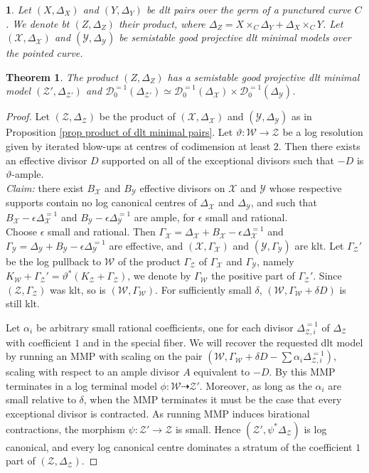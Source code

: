 \documentclass{amsart}%
\numberwithin{equation}{subsection}
\theoremstyle{plain2}
\newtheorem{theorem}[equation]{Theorem}
\theoremstyle{definition2}
\theoremstyle{stepstyle}
\theoremstyle{point}
\theoremstyle{subpoint}
\newtheorem{subpoint}[equation]{}%
\newcommand{\spa}[1]{\begin{subpoint}#1\end{subpoint}}           %
\newcommand{\D}{{\mathcal D}}
\newcommand{\cX}{\ensuremath{\mathscr{X}}}
\newcommand{\cY}{\ensuremath{\mathscr{Y}}}
\newcommand{\cZ}{\ensuremath{\mathscr{Z}}}
\newcommand{\cW}{\ensuremath{\mathscr{W}}}
\renewcommand{\cY}{\ensuremath{\mathscr{Y}}}
\begin{document}
\spa{Let $(X,\Delta_X)$ and $(Y,\Delta_Y)$ be dlt pairs over the germ of a punctured curve $C$. We denote bt $(Z,\Delta_Z)$ their product, where $\Delta_Z = X \times_C \Delta_Y + \Delta_X \times_C Y$. Let $(\cX,\Delta_{\cX})$ and $(\cY,\Delta_{\cY})$ be semistable good projective dlt minimal models over the pointed curve. }

\begin{theorem}\label{thm product of dual complex of good min dlt models} The product $(Z, \Delta_Z)$ has a semistable good projective dlt minimal model $(\cZ', \Delta_{\cZ'})$ and $\D^{=1}_0(\Delta_{\cZ'}) \simeq \D^{=1}_0(\Delta_\cX) \times \D^{=1}_0(\Delta_\cY)$.
\end{theorem}
\begin{proof}
Let $(\cZ,\Delta_{\cZ})$ be the product of $(\cX,\Delta_{\cX})$ and $(\cY,\Delta_{\cY})$ as in Proposition \ref{prop product of dlt minimal pairs}. Let $\vartheta: \cW \rightarrow \cZ$ be a log resolution given by iterated blow-ups at centres of codimension at least $2$. Then there exists an effective divisor $D$ supported on all of the exceptional divisors such that $-D$ is $\vartheta$-ample.
\\

\emph{Claim:} there exist $B_\cX$ and $B_\cY$ effective divisors on $\cX$ and $\cY$ whose respective supports contain no log canonical centres of $\Delta_{\cX}$ and $\Delta_{\cY}$, and such that $B_\cX - \epsilon \Delta_{\cX}^{=1}$ and $B_\cY - \epsilon \Delta_{\cY}^{=1}$ are ample, for $\epsilon$ small and rational.
\\

Choose $\epsilon$ small and rational. Then $\Gamma_\cX=\Delta_\cX +B_\cX -\epsilon \Delta_{\cX}^{=1}$ and $\Gamma_\cY=\Delta_\cY +B_\cY -\epsilon \Delta_{\cY}^{=1}$ are effective, and $(\cX,\Gamma_\cX)$ and $(\cY,\Gamma_\cY)$ are klt. Let $\Gamma_{\cZ}'$ be the log pullback to $\cW$ of the product $\Gamma_\cZ$ of $\Gamma_\cX$ and $\Gamma_\cY$, namely $K_\cW + \Gamma_{\cZ}' = \vartheta^*(K_\cZ + \Gamma_{\cZ})$, we denote by $\Gamma_\cW$ the positive part of $\Gamma_{\cZ}'$. Since $(\cZ,\Gamma_\cZ)$ was klt, so is $(\cW,\Gamma_\cW)$. For sufficiently small $\delta$, $(\cW, \Gamma_\cW+\delta D)$ is still klt.

Let $\alpha_i$ be arbitrary small rational coefficients, one for each divisor $\Delta_{\cZ,i}^{=1}$ of $\Delta_\cZ$ with coefficient $1$ and in the special fiber. We will recover the requested dlt model by running an MMP with scaling on the pair $(\cW, \Gamma_\cW+\delta D - \sum \alpha_i \Delta_{\cZ,i}^{=1})$, scaling with respect to an ample divisor $A$ equivalent to $-D$. By \cite{BirkarCasciniHaconEtAl} this MMP terminates in a log terminal model $\phi \colon \cW \dashrightarrow \cZ'$. Moreover, as long as the $\alpha_i$ are small relative to $\delta$, when the MMP terminates it must be the case that every exceptional divisor is contracted.  As running MMP induces birational contractions, the morphism $\psi \colon \cZ' \to \cZ$ is small. Hence $(\cZ', \psi^*\Delta_\cZ)$ is log canonical, and every log canonical centre dominates a stratum of the coefficient $1$ part of $(\cZ,\Delta_\cZ)$.


\end{proof}
\end{document}

